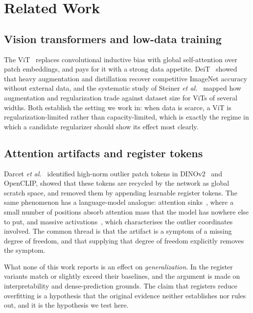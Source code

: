 \section{Related Work}

\subsection{Vision transformers and low-data training}

The ViT~\cite{dosovitskiy2021vit} replaces convolutional inductive bias with
global self-attention over patch embeddings, and pays for it with a strong data
appetite. DeiT~\cite{touvron2021deit} showed that heavy augmentation and
distillation recover competitive ImageNet accuracy without external data, and
the systematic study of Steiner \textit{et al.}~\cite{steiner2022howtotrain}
mapped how augmentation and regularization trade against dataset size for ViTs
of several widths. Both establish the setting we work in: when data is scarce, a
ViT is regularization-limited rather than capacity-limited, which is exactly the
regime in which a candidate regularizer should show its effect most clearly.

\subsection{Attention artifacts and register tokens}

Darcet \textit{et al.}~\cite{darcet2024registers} identified high-norm outlier
patch tokens in DINOv2~\cite{oquab2024dinov2} and OpenCLIP, showed that these
tokens are recycled by the network as global scratch space, and removed them by
appending learnable register tokens. The same phenomenon has a language-model
analogue: attention sinks~\cite{xiao2024streamingllm}, where a small number of
positions absorb attention mass that the model has nowhere else to put, and
massive activations~\cite{sun2024massive}, which characterises the outlier
coordinates involved. The common thread is that the artifact is a symptom of a
missing degree of freedom, and that supplying that degree of freedom explicitly
removes the symptom.

What none of this work reports is an effect on \emph{generalization}. In
\cite{darcet2024registers} the register variants match or slightly exceed their
baselines, and the argument is made on interpretability and dense-prediction
grounds. The claim that registers reduce overfitting is a hypothesis that the
original evidence neither establishes nor rules out, and it is the hypothesis we
test here.

